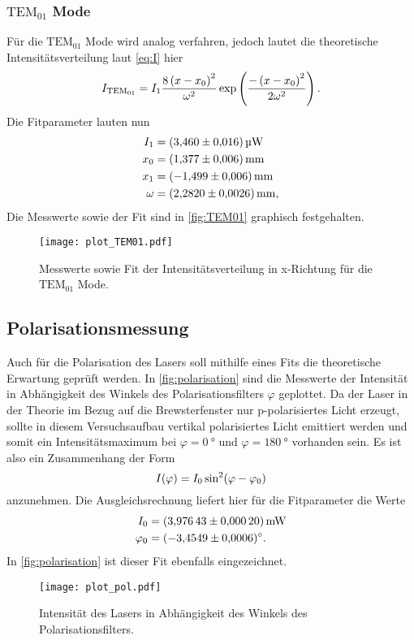 \subsubsection{$\text{TEM}_{01}$ Mode}
Für die $\text{TEM}_{01}$ Mode wird analog verfahren, jedoch lautet die theoretische Intensitätsverteilung laut \eqref{eq:I} hier
\begin{equation}
  \notag
  I_{\text{TEM}_{01}} = I_1 \frac{8\left( x - x_0\right)^2}{\omega^2} \exp \left( \frac{-\left(x - x_0\right)^2}{2\omega^2} \right).
\end{equation}
Die Fitparameter lauten nun
\begin{align*}
  I_1 &=\qty{3.460+-0.016}{\micro\watt} \\
  x_0 &=\qty{1.377+-0.006}{\milli\metre}   \\
  x_1 &=\qty{-1.499+-0.006}{\milli\metre}   \\
 \omega &=\qty{2.2820+-0.0026}{\milli\metre},
\end{align*}
Die Messwerte sowie der Fit sind in \autoref{fig:TEM01} graphisch festgehalten.
\begin{figure}[H]
  \centering
  \texttt{[image: plot\_TEM01.pdf]}
  \caption{Messwerte sowie Fit der Intensitätsverteilung in x-Richtung für die $\text{TEM}_{01}$ Mode.}
  \label{fig:TEM01}
\end{figure}

\subsection{Polarisationsmessung}
Auch für die Polarisation des Lasers soll mithilfe eines Fits die theoretische Erwartung geprüft werden.
In \autoref{fig:polarisation} sind die Messwerte der Intensität in Abhängigkeit des Winkels des Polarisationsfilters $\varphi$
geplottet.
Da der Laser in der Theorie im Bezug auf die Brewsterfenster nur p-polarisiertes Licht erzeugt, sollte in diesem
Versuchsaufbau vertikal polarisiertes Licht emittiert werden und somit ein Intensitätsmaximum bei $\varphi = \qty{0}{\degree}$ und
$\varphi = \qty{180}{\degree}$ vorhanden sein.
Es ist also ein Zusammenhang der Form
\begin{equation}
  \notag
  I(\varphi) = I_0 \sin^2\!\left(\varphi-\varphi_0\right)
\end{equation}
anzunehmen. Die Ausgleichsrechnung liefert hier für die Fitparameter die Werte
\begin{align*}
  I_0 &=\qty{3.97643+-0.00020}{\milli\watt} \\
 \varphi_0 &=\qty{-3.4549+-0.0006}{\degree}.
\end{align*}
In \autoref{fig:polarisation} ist dieser Fit ebenfalls eingezeichnet.
\begin{figure}[H]
  \centering
  \texttt{[image: plot\_pol.pdf]}
  \caption{Intensität des Lasers in Abhängigkeit des Winkels des Polarisationsfilters.}
  \label{fig:polarisation}
\end{figure}

